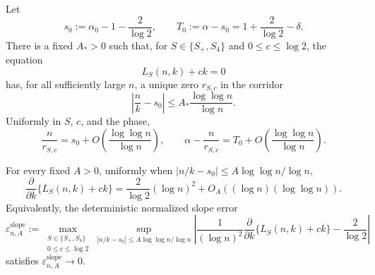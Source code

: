 \begin{lemma}
Let
\begin{equation*}
  s_0:=\alpha_0-1-\frac2{\log 2},
  \qquad
  T_0:=\alpha-s_0
      =1+\frac2{\log 2}-\delta.
  \tag{3.5}
\end{equation*}
There is a fixed $A_*>0$ such that, for
$S\in\{S_+,S_4\}$ and $0\le c\le\log 2$, the equation
\[
  L_S(n,k)+ck=0
\]
has, for all sufficiently large $n$, a unique zero $r_{S,c}$ in the
corridor
\[
  \left|\frac nk-s_0\right|
  \le A_*\frac{\log\log n}{\log n}.
\]
Uniformly in $S$, $c$, and the phase,
\begin{equation*}
  \frac n{r_{S,c}}
  =s_0+O\!\left(\frac{\log\log n}{\log n}\right),
  \qquad
  \alpha-\frac n{r_{S,c}}
  =T_0+O\!\left(\frac{\log\log n}{\log n}\right).
  \tag{3.6}
\end{equation*}

For every fixed $A>0$, uniformly when
$|n/k-s_0|\le A\log\log n/\log n$,
\begin{equation*}
  \frac{\partial}{\partial k}\{L_S(n,k)+ck\}
  =\frac2{\log 2}(\log n)^2
   +O_A((\log n)(\log\log n)).
  \tag{3.7}
\end{equation*}
Equivalently, the deterministic normalized slope error
\[
  \varepsilon_{n,A}^{\mathrm{slope}}
  :=
  \max_{\substack{S\in\{S_+,S_4\}\\0\le c\le\log 2}}
  \sup_{|n/k-s_0|\le A\log\log n/\log n}
  \left|
    \frac{1}{(\log n)^2}
    \frac{\partial}{\partial k}\{L_S(n,k)+ck\}
    -\frac2{\log 2}
  \right|
\]
satisfies $\varepsilon_{n,A}^{\mathrm{slope}}\to0$.


\end{lemma}
